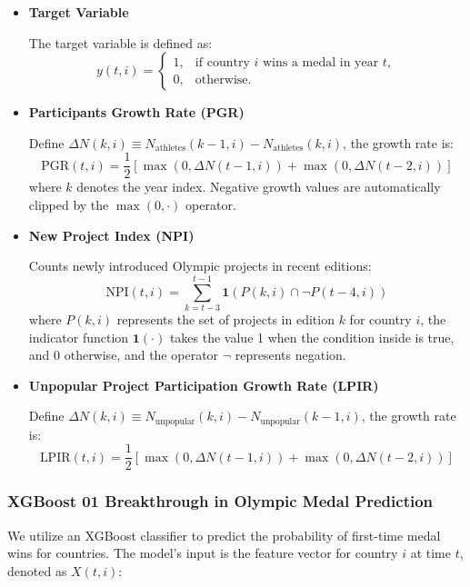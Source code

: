 \documentclass{mcmthesis}
\begin{document}
\begin{itemize}[leftmargin=0.15in, labelsep=0.1in, itemsep=1pt, parsep=0pt]
	\item \textbf{Target Variable}
	
	The target variable is defined as:
	\[
	y(t,i) = 
	\begin{cases} 
		1, & \text{if country } i \text{ wins a medal in year } t, \\ 
		0, & \text{otherwise.}
	\end{cases}
	\]
	
	\item \textbf{Participants Growth Rate (PGR)}
	
	Define \(\Delta N(k,i) \equiv N_{\text{athletes}}(k-1,i) - N_{\text{athletes}}(k,i)\), the growth rate is:
	\[
	\text{PGR}(t,i) = \frac{1}{2} \left[ \max(0, \Delta N(t-1,i)) + \max(0, \Delta N(t-2,i)) \right]
	\]
	where \(k\) denotes the year index. Negative growth values are automatically clipped by the \(\max(0,\cdot)\) operator.
	
	\item \textbf{New Project Index (NPI)}
	
	Counts newly introduced Olympic projects in recent editions:
	\[
	\text{NPI}(t,i) = \sum_{k=t-3}^{t-1} \mathbf{1}\left( P(k,i) \cap \neg P(t-4, i) \right)
	\]
	where \( P(k, i) \) represents the set of projects in edition \( k \) for country \( i \), the indicator function \( \mathbf{1}(\cdot) \) takes the value 1 when the condition inside is true, and 0 otherwise, and the operator \(\neg\) represents negation.
	
	\item \textbf{Unpopular Project Participation Growth Rate (LPIR)}
	
	Define \(\Delta N(k,i) \equiv N_{\text{unpopular}}(k,i) - N_{\text{unpopular}}(k-1,i)\), the growth rate is:
	\[
	\text{LPIR}(t,i) = \frac{1}{2} \left[ \max(0, \Delta N(t-1,i)) + \max(0, \Delta N(t-2,i)) \right]
	\]
\end{itemize}


\subsubsection{XGBoost 01 Breakthrough in Olympic Medal Prediction}

We utilize an XGBoost classifier to predict the probability of first-time medal wins for countries. The model’s input is the feature vector for country \( i \) at time \( t \), denoted as \( X(t,i) \):
\end{document}

